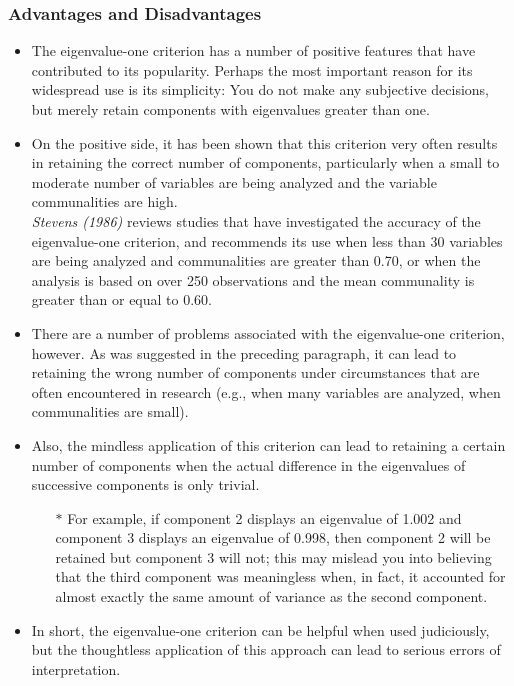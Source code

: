 \documentclass[a4paper,12pt]{article}
\begin{document}
\subsubsection*{Advantages and Disadvantages}
\begin{itemize}
	\item The eigenvalue-one criterion has a number of positive features that have contributed to its
	popularity.  Perhaps the most important reason for its widespread use is its simplicity:  You do
	not make any subjective decisions, but merely retain components with eigenvalues greater than
	one.
	
	
	\item 	On the positive side, it has been shown that this criterion very often results in retaining the
	correct number of components, particularly when a small to moderate number of variables are
	being analyzed and the variable communalities are high.
	\\  \textit{Stevens (1986)} reviews studies that
	have investigated the accuracy of the eigenvalue-one criterion, and recommends its use when
	less than 30 variables are being analyzed and communalities are greater than 0.70, or when the
	analysis is based on over 250 observations and the mean communality is greater than or equal to
	0.60.
	
	\item 	There are a number of problems associated with the eigenvalue-one criterion, however.  As was
	suggested in the preceding paragraph, it can lead to retaining the wrong number of components
	under circumstances that are often encountered in research (e.g., when many variables are
	analyzed, when communalities are small).
	
	\item 	Also, the mindless application of this criterion can
	lead to retaining a certain number of components when the actual difference in the eigenvalues
	of successive components is only trivial.  
	\begin{itemize}
		\item[$\ast$] For example, if component 2 displays an eigenvalue of
		1.002 and component 3 displays an eigenvalue of 0.998, then component 2 will be retained but
		component 3 will not; this may mislead you into believing that the third component was
		meaningless when, in fact, it accounted for almost exactly the same amount of variance as the
		second component.
	\end{itemize}

	
	\item 	In short, the eigenvalue-one criterion can be helpful when used judiciously,
	but the thoughtless application of this approach can lead to serious errors of interpretation.
\end{itemize}
\end{document}
